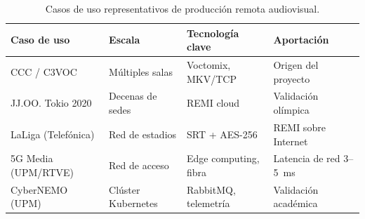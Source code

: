 \begin{table}[H]
  \centering
  \caption{Casos de uso representativos de producción remota audiovisual.}
  \label{tab:casos_uso_remi}
  \small
  \begin{tabularx}{\textwidth}{|l|l|l|X|}
    \hline
    \textbf{Caso de uso} & \textbf{Escala} & \textbf{Tecnología clave} & \textbf{Aportación} \\
    \hline
    CCC / C3VOC          & Múltiples salas   & Voctomix, MKV/TCP    & Origen del proyecto \\
    JJ.OO. Tokio 2020    & Decenas de sedes  & REMI cloud           & Validación olímpica \\
    LaLiga (Telefónica)  & Red de estadios   & SRT + AES-256        & REMI sobre Internet \\
    5G Media (UPM/RTVE)  & Red de acceso     & Edge computing, fibra & Latencia de red 3--5~ms \\
    CyberNEMO (UPM)      & Clúster Kubernetes & RabbitMQ, telemetría & Validación académica \\
    \hline
  \end{tabularx}
\end{table}
